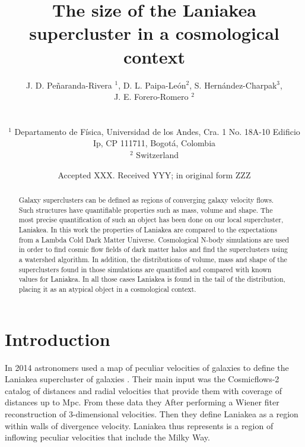 \documentclass[usenatbib]{mnras}
\title[Laniakea in context]{The size of the Laniakea supercluster in a
cosmological context}
\author[Pe\~naranda-Rivera et al.]{
\parbox[t]{\textwidth}{
    {J. D. Pe\~naranda-Rivera $^1$,} 
    {D. L.  Paipa-Le\'on$^{2}$,}
    {S. Hern\'andez-Charpak$^3$,}\\
    {J. E. Forero-Romero $^{2}$}
}
\\\\
$^{1}$ Departamento de F\'isica, Universidad de los Andes, Cra. 1
  No. 18A-10 Edificio Ip, CP 111711, Bogot\'a, Colombia \\
$^{2}$ Switzerland\\
}
\date{Accepted XXX. Received YYY; in original form ZZZ}
\begin{document}
\label{firstpage}
\pagerange{\pageref{firstpage}--\pageref{lastpage}}
\maketitle

\maketitle
\begin{abstract}
Galaxy superclusters can be defined as regions of converging galaxy
velocity flows. 
Such structures have quantifiable properties such as mass, volume and
shape. 
The most precise quantification of such an object has been done on our local supercluster, Laniakea. 
In this work the properties of Laniakea are compared to the
expectations from a Lambda Cold Dark Matter Universe. 
Cosmological N-body simulations are used in order to find cosmic flow
fields of dark matter halos and find the superclusters using a
watershed algorithm. 
In addition, the distributions of volume, mass and shape of the
superclusters found in those simulations are quantified and compared
with known values for Laniakea. 
In all those cases Laniakea is found in the tail of the distribution,
placing it as an atypical object in a cosmological context.  
\end{abstract}

\begin{keywords}
\end{keywords}




\section{Introduction}

In 2014 astronomers used a map  of peculiar velocities of galaxies to
define the Laniakea supercluster of galaxies
\citep{2014Natur.513...71T}.  
Their main input was the Cosmicflows-2 catalog of distances and radial
velocities that provide them with coverage of distances up to Mpc. 
From these data they After performing a Wiener fiter reconstruction of
3-dimensional velocities.
Then they define Laniakea as  a region within walls of divergence velocity.  
Laniakea thus represents is a region of inflowing peculiar velocities
that include the Milky Way. 
\end{document}
